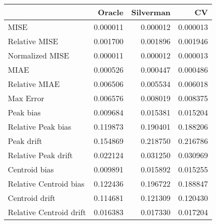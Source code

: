 \begin{tabular}{lrrr}
  \hline
 & Oracle & Silverman & CV \\ 
  \hline
MISE & 0.000011 & 0.000012 & 0.000013 \\ 
  Relative MISE & 0.001700 & 0.001896 & 0.001946 \\ 
  Normalized MISE & 0.000011 & 0.000012 & 0.000013 \\ 
  MIAE & 0.000526 & 0.000447 & 0.000486 \\ 
  Relative MIAE & 0.006506 & 0.005534 & 0.006018 \\ 
  Max Error & 0.006576 & 0.008019 & 0.008375 \\ 
  Peak bias & 0.009684 & 0.015381 & 0.015204 \\ 
  Relative Peak bias & 0.119873 & 0.190401 & 0.188206 \\ 
  Peak drift & 0.154869 & 0.218750 & 0.216786 \\ 
  Relative Peak drift & 0.022124 & 0.031250 & 0.030969 \\ 
  Centroid bias & 0.009891 & 0.015892 & 0.015255 \\ 
  Relative Centroid bias & 0.122436 & 0.196722 & 0.188847 \\ 
  Centroid drift & 0.114681 & 0.121309 & 0.120430 \\ 
  Relative Centroid drift & 0.016383 & 0.017330 & 0.017204 \\ 
   \hline
\end{tabular}
